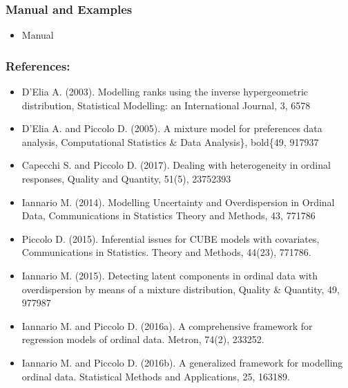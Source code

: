 \documentclass[letterpaper,10pt,english]{sphinxmanual}
\begin{document}
\subsubsection{Manual and Examples}
\label{\detokenize{cubmods:id106}}\begin{itemize}
\item {} 
\sphinxAtStartPar
Manual 

\end{itemize}


\subsubsection{References:}
\label{\detokenize{cubmods:id107}}\begin{itemize}
\item {} 
\sphinxAtStartPar
D’Elia A. (2003). Modelling ranks using the inverse hypergeometric distribution, Statistical Modelling: an International Journal, 3, 65\textendash{}78

\item {} 
\sphinxAtStartPar
D’Elia A. and Piccolo D. (2005). A mixture model for preferences data analysis, Computational Statistics \& Data Analysis\},  bold\{49, 917\textendash{}937

\item {} 
\sphinxAtStartPar
Capecchi S. and Piccolo D. (2017). Dealing with heterogeneity in ordinal responses, Quality and Quantity, 51(5), 2375\textendash{}2393

\item {} 
\sphinxAtStartPar
Iannario M. (2014). Modelling Uncertainty and Overdispersion in Ordinal Data, Communications in Statistics \sphinxhyphen{} Theory and Methods, 43, 771\textendash{}786

\item {} 
\sphinxAtStartPar
Piccolo D. (2015). Inferential issues for CUBE models with covariates, Communications in Statistics. Theory and Methods, 44(23), 771\textendash{}786.

\item {} 
\sphinxAtStartPar
Iannario M. (2015). Detecting latent components in ordinal data with overdispersion by means of a mixture distribution, Quality \& Quantity, 49, 977\textendash{}987

\item {} 
\sphinxAtStartPar
Iannario M. and Piccolo D. (2016a). A comprehensive framework for regression models of ordinal data. Metron, 74(2), 233\textendash{}252.

\item {} 
\sphinxAtStartPar
Iannario M. and Piccolo D. (2016b). A generalized framework for modelling ordinal data. Statistical Methods and Applications, 25, 163\textendash{}189.

\end{itemize}
\end{document}
